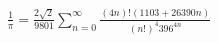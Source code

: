 \documentclass[preview]{standalone}
\begin{document}
\begin{align*}
\frac{1}{\pi} = \frac{2\sqrt{2}}{9801} \sum_{n=0}^{\infty} \frac{(4n)! (1103 + 26390n)}{(n!)^4 396^{4n}}
\end{align*}
\end{document}
